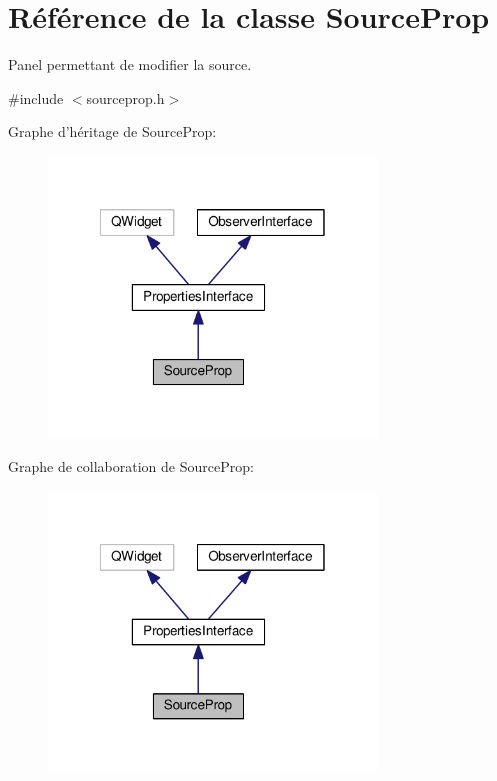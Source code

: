 \hypertarget{classSourceProp}{\section{Référence de la classe Source\+Prop}
\label{classSourceProp}
}


Panel permettant de modifier la source.  




{\ttfamily \#include $<$sourceprop.\+h$>$}



Graphe d'héritage de Source\+Prop\+:\nopagebreak
\begin{figure}[H]
\begin{center}
\leavevmode
\includegraphics[width=247pt]{d6/da2/classSourceProp__inherit__graph}
\end{center}
\end{figure}


Graphe de collaboration de Source\+Prop\+:\nopagebreak
\begin{figure}[H]
\begin{center}
\leavevmode
\includegraphics[width=247pt]{d0/d35/classSourceProp__coll__graph}
\end{center}
\end{figure}
